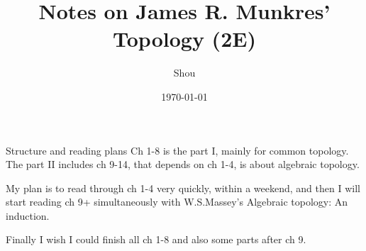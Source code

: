 \documentclass{report}
\theoremstyle{definition}
\begin{document}
\title{Notes on James R. Munkres' Topology (2E)}
\author{Shou}
\date{\today}

\maketitle
\tableofcontents

\setcounter{chapter}{-1}
\begin{chapter}{Structure and reading plans}
Ch 1-8 is the part I, mainly for common topology. The part II includes
ch 9-14, that depends on ch 1-4, is about algebraic topology.

My plan is to read through ch 1-4 very quickly, within a weekend, and
then I will start reading ch 9+ simultaneously with W.S.Massey's
Algebraic topology: An induction.

Finally I wish I could finish all ch 1-8 and also some parts after ch 9.
\end{chapter}
\end{document}
